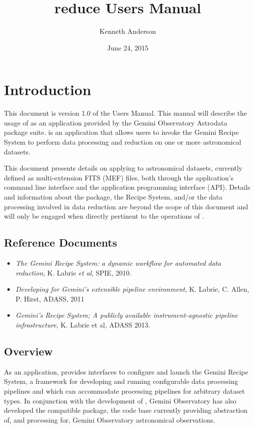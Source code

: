\documentclass[letterpaper,10pt,english]{sphinxmanual}
\title{reduce Users Manual}
\date{June 24, 2015}
\author{Kenneth Anderson}
\begin{document}
\maketitle
\tableofcontents
{}\label{index-latex::doc}



\chapter{Introduction}
\label{intro:introduction}\label{intro:reduce-users-manual}\label{intro::doc}
This document is version 1.0 of the  Users Manual. This manual will
describe the usage of  as an application provided by the Gemini Observatory
Astrodata package suite.  is an application that allows users to invoke the
Gemini Recipe System to perform data processing and reduction on one or more
astronomical datasets.

This document presents details on applying  to astronomical datasets,
currently defined as multi-extension FITS (MEF) files, both through the application's
command line interface and the application programming interface (API). Details and
information about the  package, the Recipe System, and/or the data
processing involved in data reduction are beyond the scope of this document and
will only be engaged when directly pertinent to the operations of .


\section{Reference Documents}
\label{intro:reference-documents}\begin{itemize}
\item {} 
\emph{The Gemini Recipe System: a dynamic workflow for automated data reduction},
K. Labrie \emph{et al}, SPIE, 2010.

\item {} 
\emph{Developing for Gemini’s extensible pipeline environment}, K. Labrie,
C. Allen, P. Hirst, ADASS, 2011

\item {} 
\emph{Gemini's Recipe System; A publicly available instrument-agnostic pipeline
infrastructure}, K. Labrie et al, ADASS 2013.

\end{itemize}


\section{Overview}
\label{intro:overview}
As an application,  provides interfaces to configure and launch the
Gemini Recipe System, a framework for developing and running configurable data
processing pipelines and which can accommodate processing pipelines for arbitrary
dataset types. In conjunction with the development of , Gemini
Observatory has also developed the compatible  package, the
code base currently providing abstraction of, and processing for, Gemini
Observatory astronomical observations.
\end{document}
